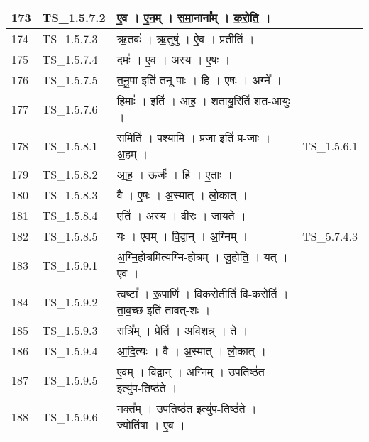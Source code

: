\documentclass[17pt]{extarticle}
\begin{document}
\begin{longtable}{||p{0.4in}||p{0.9in}||p{4.0in}||p{0.9in}||}
        \hline
            173 & TS\_1.5.7.2 & ए॒व   ।   ए॒न॒म्   ।   स॒मा॒नाना᳚म्   ।   क॒रो॒ति॒   ।    &      \\
        \hline
            174 & TS\_1.5.7.3 & ऋ॒तवः॑   ।   ऋ॒तुषु॑   ।   ऐ॒व   ।   प्रतीति॑   ।    &      \\
        \hline
            175 & TS\_1.5.7.4 & दमः॑   ।   ए॒व   ।   अ॒स्य॒   ।   ए॒षः   ।    &      \\
        \hline
            176 & TS\_1.5.7.5 & त॒नू॒पा इति॑ तनू{-}पाः   ।   हि   ।   ए॒षः   ।   अग्ने᳚   ।    &      \\
        \hline
            177 & TS\_1.5.7.6 & हिमाः᳚   ।   इति॑   ।   आ॒ह॒   ।   श॒तायु॒रिति॑ श॒त{-}आ॒युः॒   ।    &      \\
        \hline
            178 & TS\_1.5.8.1 & समिति॑   ।   प॒श्या॒मि॒   ।   प्र॒जा इति॑ प्र{-}जाः   ।   अ॒हम्   ।    & TS\_1.5.6.1        \\
        \hline
            179 & TS\_1.5.8.2 & आ॒ह॒   ।   ऊर्जः॑   ।   हि   ।   ए॒ताः   ।    &      \\
        \hline
            180 & TS\_1.5.8.3 & वै   ।   ए॒षः   ।   अ॒स्मात्   ।   लो॒कात्   ।    &      \\
        \hline
            181 & TS\_1.5.8.4 & एति॑   ।   अ॒स्य॒   ।   वी॒रः   ।   जा॒य॒ते॒   ।    &      \\
        \hline
            182 & TS\_1.5.8.5 & यः   ।   ए॒वम्   ।   वि॒द्वान्   ।   अ॒ग्निम्   ।    &  TS\_5.7.4.3       \\
        \hline
            183 & TS\_1.5.9.1 & अ॒ग्नि॒हो॒त्रमित्य॑ग्नि{-}हो॒त्रम्   ।   जु॒हो॒ति॒   ।   यत्   ।   ए॒व   ।    &      \\
        \hline
            184 & TS\_1.5.9.2 & त्वष्टा᳚   ।   रू॒पाणि॑   ।   वि॒क॒रोतीति॑ वि{-}क॒रोति॑   ।   ता॒व॒च्छ इति॑ तावत्{-}शः   ।    &      \\
        \hline
            185 & TS\_1.5.9.3 & रात्रि᳚म्   ।   प्रेति॑   ।   अ॒वि॒श॒न्न्   ।   ते   ।    &      \\
        \hline
            186 & TS\_1.5.9.4 & आ॒दि॒त्यः   ।   वै   ।   अ॒स्मात्   ।   लो॒कात्   ।    &      \\
        \hline
            187 & TS\_1.5.9.5 & ए॒वम्   ।   वि॒द्वान्   ।   अ॒ग्निम्   ।   उ॒प॒तिष्ठ॑त॒ इत्यु॑प{-}तिष्ठ॑ते   ।    &      \\
        \hline
            188 & TS\_1.5.9.6 & नक्त᳚म्   ।   उ॒प॒तिष्ठ॑त॒ इत्यु॑प{-}तिष्ठ॑ते   ।   ज्योति॑षा   ।   ए॒व   ।    &      \\
        \hline

\end{longtable}
\end{document}
